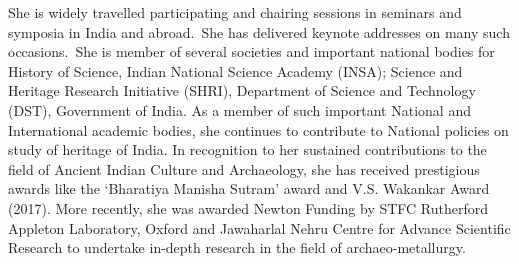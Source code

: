 She is widely travelled participating and chairing sessions in seminars and symposia in India and abroad.~She has delivered keynote addresses on many such occasions.~She is member of several societies and important national bodies for History of Science, Indian National Science Academy (INSA); Science and   Heritage Research Initiative (SHRI), Department of Science and Technology (DST), Government of India. As a member of such important National and International academic bodies, she continues to contribute to National policies on study of heritage of India. In recognition to her sustained contributions to the field of Ancient Indian Culture and Archaeology, she has received prestigious awards like the ‘Bharatiya Manisha Sutram’ award and V.S. Wakankar Award (2017). More recently, she was awarded Newton Funding by STFC Rutherford Appleton Laboratory, Oxford and Jawaharlal Nehru Centre for Advance Scientific Research to undertake in-depth research in the field of archaeo-metallurgy.

\label{endauthor}
